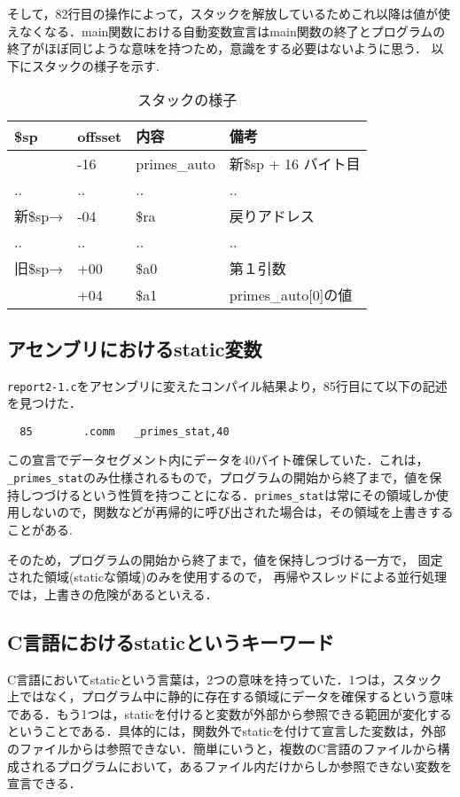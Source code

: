 \documentclass[a4j,11pt]{jarticle}
\begin{document}
そして，82行目の操作によって，スタックを解放しているためこれ以降は値が使えなくなる．main関数における自動変数宣言はmain関数の終了とプログラムの終了がほぼ同じような意味を持つため，意識をする必要はないように思う．
以下にスタックの様子を示す.
\begin{table}[htb]
  \caption{スタックの様子}
  \label{tab:stack2}
  \centering
  \begin{tabular}{|l|l|l|l|}
  \hline
  \$sp   & offsset & 内容           & 備考                    \\ \hline
         & -16     & primes\_auto & 新\$sp + 16 バイト目       \\ \hline
  ..     & ..      & ..           & ..                    \\ \hline
  新\$sp→ & -04     & \$ra         & 戻りアドレス                \\ \hline
  ..     & ..      & ..           & ..                    \\ \hline
  旧\$sp→ & +00     & \$a0         & 第１引数                  \\ \hline
         & +04     & \$a1         & primes\_auto{[}0{]}の値 \\ \hline
  \end{tabular}
  \end{table}

\subsection{アセンブリにおけるstatic変数}
\verb|report2-1.c|をアセンブリに変えたコンパイル結果より，85行目にて以下の記述を見つけた．
\begin{verbatim}
  85		.comm	_primes_stat,40
\end{verbatim}
この宣言でデータセグメント内にデータを40バイト確保していた．これは，\verb|_primes_stat|のみ仕様されるもので，プログラムの開始から終了まで，値を保持しつづけるという性質を持つことになる．\verb|primes_stat|は常にその領域しか使用しないので，関数などが再帰的に呼び出された場合は，その領域を上書きすることがある.

そのため，プログラムの開始から終了まで，値を保持しつづける一方で， 固定された領域(staticな領域)のみを使用するので， 再帰やスレッドによる並行処理では，上書きの危険があるといえる．

\subsection{C言語におけるstaticというキーワード}
C言語においてstaticという言葉は，2つの意味を持っていた．1つは，スタック上ではなく，プログラム中に静的に存在する領域にデータを確保するという意味である．もう1つは，staticを付けると変数が外部から参照できる範囲が変化するということである．具体的には，関数外でstaticを付けて宣言した変数は，外部のファイルからは参照できない．簡単にいうと，複数のC言語のファイルから構成されるプログラムにおいて，あるファイル内だけからしか参照できない変数を宣言できる．
\end{document}
